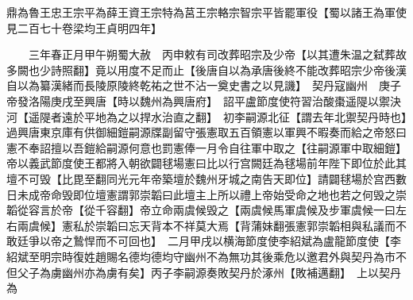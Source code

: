 鼎為魯王忠王宗平為薛王資王宗特為莒王宗輅宗智宗平皆罷軍役【蜀以諸王為軍使見二百七十卷梁均王貞明四年】

　　三年春正月甲午朔蜀大赦　丙申敕有司改葬昭宗及少帝【以其遭朱温之弑葬故多闕也少詩照翻】竟以用度不足而止【後唐自以為承唐後終不能改葬昭宗少帝後漢自以為纂漢緒而長陵原陵終乾祐之世不沾一奠史書之以見譏】　契丹寇幽州　庚子帝發洛陽庚戌至興唐【時以魏州為興唐府】　詔平盧節度使符習治酸棗遥隄以禦決河【遥隄者遠於平地為之以捍水治直之翻】　初李嗣源北征【謂去年北禦契丹時也】過興唐東京庫有供御細鎧嗣源牒副留守張憲取五百領憲以軍興不暇奏而給之帝怒曰憲不奉詔擅以吾鎧給嗣源何意也罰憲俸一月令自往軍中取之【往嗣源軍中取細鎧】帝以義武節度使王都將入朝欲闢毬場憲曰比以行宫闕廷為毬場前年陛下即位於此其壇不可毁【比毘至翻同光元年帝築壇於魏州牙城之南告天即位】請闢毬場於宫西數日未成帝命毁即位壇憲謂郭崇韜曰此壇主上所以禮上帝始受命之地也若之何毁之崇韜從容言於帝【從千容翻】帝立命兩虞候毁之【兩虞候馬軍虞候及步軍虞候一曰左右兩虞候】憲私於崇韜曰忘天背本不祥莫大焉【背蒲妹翻張憲郭崇韜相與私議而不敢廷爭以帝之鷙悍而不可回也】　二月甲戌以横海節度使李紹斌為盧龍節度使【李紹斌至明宗時復姓趙賜名德均德均守幽州不為無功其後乘危以邀君外與契丹為市不但父子為虜幽州亦為虜有矣】丙子李嗣源奏敗契丹於涿州【敗補邁翻】　上以契丹為

